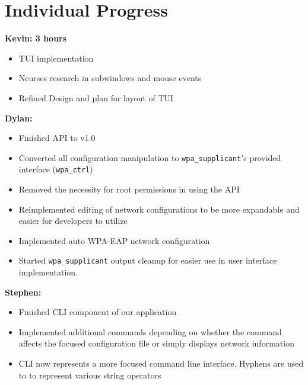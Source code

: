 \documentclass[11pt]{article}
\begin{document}
\section{Individual Progress}

\textbf{Kevin: 3 hours}
\begin{itemize}
  \item TUI implementation
  \item Ncurses research in subwindows and mouse events
  \item Refined Design and plan for layout of TUI
\end{itemize}

\textbf{Dylan:}
\begin{itemize}
  \item Finished API to v1.0
  \item Converted all configuration manipulation to \texttt{wpa\_supplicant}'s
    provided interface (\texttt{wpa\_ctrl})
  \item Removed the necessity for root permissions in using the API
  \item Reimplemented editing of network configurations to be more expandable
    and easier for developers to utilize
  \item Implemented auto WPA-EAP network configuration
  \item Started \texttt{wpa\_supplicant} output cleanup for easier use in user
    interface implementation.
\end{itemize}

\textbf{Stephen:}
\begin{itemize}
  \item Finished CLI component of our application
  \item Implemented additional commands depending on whether the command affects 
    the focused configuration file or simply displays network information 
  \item CLI now represents a more focused command line interface. Hyphens are 
    used to to represent various string operators 
\end{itemize}
\end{document}
